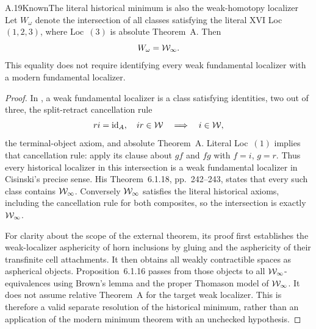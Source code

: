\begin{claim}{A.19}{Known}{The literal historical minimum is also the weak-homotopy localizer}
Let $W_\omega$ denote the intersection of all classes satisfying the literal XVI Loc~$(1,2,3)$, where Loc~$(3)$ is absolute Theorem~A. Then
\[
W_\omega=\mathcal{W}_{\infty}.
\]
This equality does not require identifying every weak fundamental localizer with a modern fundamental localizer.
\end{claim}
\begin{proof}
In \citet[\S1.4.12, p.~56; Definition~6.1.12, pp.~240--241]{RootCisinski2006}, a weak fundamental localizer is a class satisfying identities, two out of three, the split-retract cancellation rule
\[
ri=\mathrm{id}_A,\quad ir\in\mathcal{W}\quad\Longrightarrow\quad i\in\mathcal{W},
\]
the terminal-object axiom, and absolute Theorem~A. Literal Loc~$(1)$ implies that cancellation rule: apply its clause about $gf$ and $fg$ with $f=i$, $g=r$. Thus every historical localizer in this intersection is a weak fundamental localizer in Cisinski's precise sense. His Theorem~6.1.18, pp.~242--243, states that every such class contains $\mathcal{W}_{\infty}$. Conversely $\mathcal{W}_{\infty}$ satisfies the literal historical axioms, including the cancellation rule for both composites, so the intersection is exactly $\mathcal{W}_{\infty}$.

For clarity about the scope of the external theorem, its proof first establishes the weak-localizer asphericity of horn inclusions by gluing and the asphericity of their transfinite cell attachments. It then obtains all weakly contractible spaces as aspherical objects. Proposition~6.1.16 passes from those objects to all $\mathcal{W}_{\infty}$-equivalences using Brown's lemma and the proper Thomason model of $\mathcal{W}_{\infty}$. It does not assume relative Theorem~A for the target weak localizer. This is therefore a valid separate resolution of the historical minimum, rather than an application of the modern minimum theorem with an unchecked hypothesis.
\end{proof}
